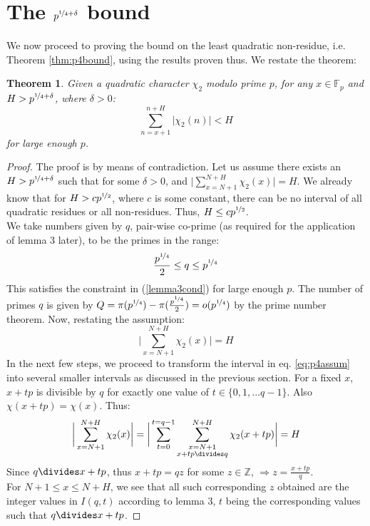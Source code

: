 \documentclass{report}
\newtheorem*{theorem*}{Theorem}
\begin{document}
\section{The $p^{\nicefrac{1}{4}+\delta}$ bound}
We now proceed to proving the bound on the least quadratic non-residue, i.e. Theorem \ref{thm:p4bound}, using the results proven thus. We restate the theorem:
\begin{theorem*}
Given a quadratic character $\chi_2$ modulo prime $p$, for any $x\in\mathbb{F}_p$ and $H>p^{\nicefrac{1}{4}+\delta}$, where $\delta>0$:
\[\sum\limits_{n=x+1}^{n+H}\lvert\chi_2(n)\rvert<H\]
for large enough $p$.
\end{theorem*}
\begin{proof}
The proof is by means of contradiction. Let us assume there exists an $H>p^{\nicefrac{1}{4}+\delta}$ such that for some $\delta>0$, and $\Big \lvert \sum\limits_{x=N+1}^{N+H}\chi_2(x)\Big \rvert=H$. We already know that for $H>cp^{\nicefrac{1}{2}}$, where $c$ is some constant, there can be no interval of all quadratic residues or all non-residues. Thus, $H\leq cp^{\nicefrac{1}{2}}$.\\
We take numbers given by $q$, pair-wise co-prime (as required for the application of lemma 3 later), to be the primes in the range:
$$\frac{p^{\nicefrac{1}{4}}}{2} \leq q \leq p^{\nicefrac{1}{4}}$$
This satisfies the constraint in (\ref{lemma3cond}) for large enough $p$. The number of primes $q$ is given by $Q=\pi(p^{\nicefrac{1}{4}})-\pi(\frac{p^{\nicefrac{1}{4}}}{2})=o(p^{\nicefrac{1}{4}})$ by the prime number theorem. Now, restating the assumption:
\begin{equation} \label{eq:p4assum}
\bigg \lvert\sum\limits_{x=N+1}^{N+H}\chi_2(x)\bigg \rvert=H
\end{equation}
In the next few steps, we proceed to transform the interval in eq. \ref{eq:p4assum} into several smaller intervals as discussed in the previous section. For a fixed $x$, $x+tp$ is divisible by $q$ for exactly one value of $t\in\{0,1,...q-1\}$. Also $\chi(x+tp)=\chi(x)$. Thus:
$$\bigg \lvert\sum\limits_{x=N+1}^{N+H}\chi_2(x)\bigg \rvert=\bigg \lvert\sum\limits_{t=0}^{t=q-1}\sum\limits_{\substack{x=N+1\\x+tp\divides q}}^{N+H}\chi_2(x+tp)\bigg \rvert=H$$
Since $q\divides x+tp$, thus $x+tp=qz$ for some $z\in\mathbb{Z}$, $\Rightarrow z=\frac{x+tp}{q}$.\\
For $N+1\leq x \leq N+H$, we see that all such corresponding $z$ obtained are the integer values in $I(q,t)$ according to lemma 3, $t$ being the corresponding values such that $q \divides x+tp$.

\end{proof}
\end{document}
